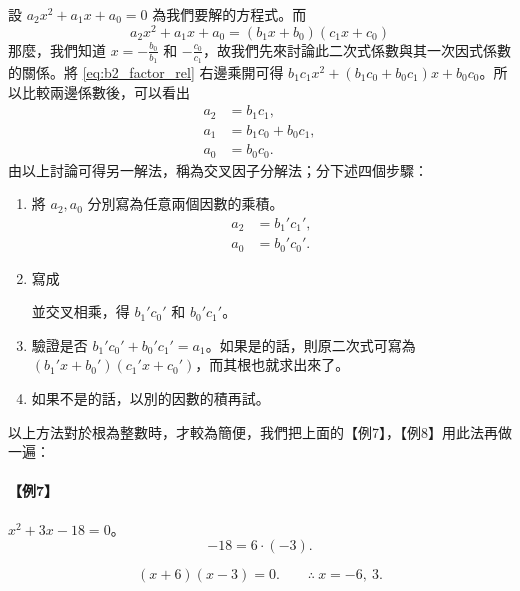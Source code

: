 設 $a_2 x^2 + a_1 x + a_0 = 0$ 為我們要解的方程式。而
\begin{equation}\label{eq:b2_factor_rel}\tag{1}
a_2 x^2 + a_1 x + a_0 = (b_1 x + b_0)(c_1 x + c_0)
\end{equation}
那麼，我們知道 $x = -\frac{b_0}{b_1}$ 和 $-\frac{c_0}{c_1}$，故我們先來討論此二次式係數與其一次因式係數的關係。將 \eqref{eq:b2_factor_rel} 右邊乘開可得 $b_1 c_1 x^2 + (b_1 c_0 + b_0 c_1)x + b_0 c_0$。所以比較兩邊係數後，可以看出
\begin{align*}
a_2 &= b_1 c_1, \\
a_1 &= b_1 c_0 + b_0 c_1, \\
a_0 &= b_0 c_0.
\end{align*}
由以上討論可得另一解法，稱為交叉因子分解法；分下述四個步驟：
\begin{enumerate}
  \item[(一)] 將 $a_2, a_0$ 分別寫為任意兩個因數的乘積。
  \begin{align*}
  a_2 &= {b_1}' {c_1}', \\
  a_0 &= {b_0}' {c_0}'.
  \end{align*}
  \item[(二)] 寫成
  \begin{center}
  \end{center}
  並交叉相乘，得 ${b_1}' {c_0}'$ 和 ${b_0}' {c_1}'$。
  \item[(三)] 驗證是否 ${b_1}' {c_0}' + {b_0}' {c_1}' = a_1$。如果是的話，則原二次式可寫為 $({b_1}' x + {b_0}')({c_1}' x + {c_0}')$，而其根也就求出來了。
  \item[(四)] 如果不是的話，以別的因數的積再試。
\end{enumerate}

以上方法對於根為整數時，才較為簡便，我們把上面的【例7】，【例8】用此法再做一遍：

\paragraph{【例7】} $x^2 + 3x - 18 = 0$。
\[
-18 = 6 \cdot (-3).
\]
\begin{center}
\end{center}
\[
(x+6)(x-3) = 0. \qquad \therefore\ x = -6,\ 3.
\]

